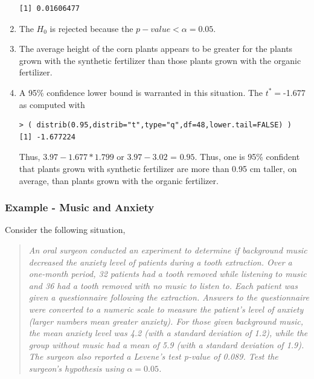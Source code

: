 \documentclass[10pt,openany]{book}\usepackage[]{graphicx}\usepackage[]{color}
\makeatletter
\newenvironment{kframe}{%
 \def\at@end@of@kframe{}%
 \ifinner\ifhmode%
  \def\at@end@of@kframe{\end{minipage}}%
  \begin{minipage}{\columnwidth}%
 \fi\fi%
 \def\FrameCommand##1{\hskip\@totalleftmargin \hskip-\fboxsep
 \colorbox{shadecolor}{##1}\hskip-\fboxsep
     \hskip-\linewidth \hskip-\@totalleftmargin \hskip\columnwidth}%
 \MakeFramed {\advance\hsize-\width
   \@totalleftmargin\z@ \linewidth\hsize
   \@setminipage}}%
 {\par\unskip\endMakeFramed%
 \at@end@of@kframe}
\newenvironment{knitrout}{}{} %
\makeatother
\begin{document}
\begin{enumerate}
\begin{knitrout}
\begin{kframe}
\begin{verbatim}
[1] 0.01606477
\end{verbatim}
\end{kframe}
\end{knitrout}
    \item The $H_{0}$ is rejected because the $p-value <\alpha=0.05$.
    \item The average height of the corn plants appears to be greater for the plants grown with the synthetic fertilizer than those plants grown with the organic fertilizer.
    \item A 95\% confidence lower bound is warranted in this situation.  The $t^{*}=$-1.677 as computed with
\begin{knitrout}
\color{fgcolor}\begin{kframe}
\begin{verbatim}
> ( distrib(0.95,distrib="t",type="q",df=48,lower.tail=FALSE) )
[1] -1.677224
\end{verbatim}
\end{kframe}
\end{knitrout}
Thus, $3.97-1.677*1.799$ or $3.97-3.02$ = $0.95$.  Thus, one is 95\% confident that plants grown with synthetic fertilizer are more than 0.95 cm taller, on average, than plants grown with the organic fertilizer.
  \end{enumerate}

\subsubsection{Example - Music and Anxiety}
Consider the following situation,
\begin{quote}
\textsl{An oral surgeon conducted an experiment to determine if background music decreased the anxiety level of patients during a tooth extraction.  Over a one-month period, 32 patients had a tooth removed while listening to music and 36 had a tooth removed with no music to listen to.  Each patient was given a questionnaire following the extraction.  Answers to the questionnaire were converted to a numeric scale to measure the patient's level of anxiety (larger numbers mean greater anxiety).  For those given background music, the mean anxiety level was 4.2 (with a standard deviation of 1.2), while the group without music had a mean of 5.9 (with a standard deviation of 1.9).  The surgeon also reported a Levene's test p-value of 0.089.  Test the surgeon's hypothesis using $\alpha=0.05$.}
\end{quote}
\end{document}
